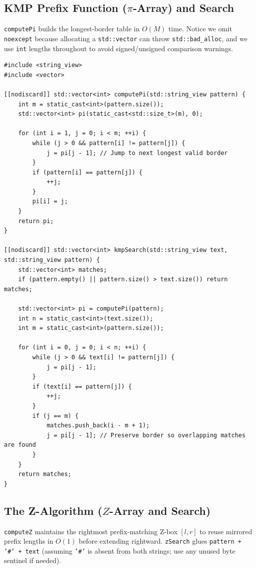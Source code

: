 \documentclass[11pt,a4paper]{article}
\theoremstyle{definition}
\begin{document}
\subsection{KMP Prefix Function ($\pi$-Array) and Search}

\texttt{computePi} builds the longest-border table in $O(M)$ time. Notice we omit \texttt{noexcept} because allocating a \texttt{std::vector} can throw \texttt{std::bad\_alloc}, and we use \texttt{int} lengths throughout to avoid signed/unsigned comparison warnings.

\begin{lstlisting}[caption={KMP Prefix Function and Zero-Backtracking Pattern Search}]
#include <string_view>
#include <vector>

[[nodiscard]] std::vector<int> computePi(std::string_view pattern) {
    int m = static_cast<int>(pattern.size());
    std::vector<int> pi(static_cast<std::size_t>(m), 0);

    for (int i = 1, j = 0; i < m; ++i) {
        while (j > 0 && pattern[i] != pattern[j]) {
            j = pi[j - 1]; // Jump to next longest valid border
        }
        if (pattern[i] == pattern[j]) {
            ++j;
        }
        pi[i] = j;
    }
    return pi;
}

[[nodiscard]] std::vector<int> kmpSearch(std::string_view text, std::string_view pattern) {
    std::vector<int> matches;
    if (pattern.empty() || pattern.size() > text.size()) return matches;

    std::vector<int> pi = computePi(pattern);
    int n = static_cast<int>(text.size());
    int m = static_cast<int>(pattern.size());

    for (int i = 0, j = 0; i < n; ++i) {
        while (j > 0 && text[i] != pattern[j]) {
            j = pi[j - 1];
        }
        if (text[i] == pattern[j]) {
            ++j;
        }
        if (j == m) {
            matches.push_back(i - m + 1);
            j = pi[j - 1]; // Preserve border so overlapping matches are found
        }
    }
    return matches;
}
\end{lstlisting}

\subsection{The Z-Algorithm ($Z$-Array and Search)}

\texttt{computeZ} maintains the rightmost prefix-matching Z-box $[l, r]$ to reuse mirrored prefix lengths in $O(1)$ before extending rightward. \texttt{zSearch} glues \texttt{pattern + '\#' + text} (assuming \texttt{'\#'} is absent from both strings; use any unused byte sentinel if needed).
\end{document}
